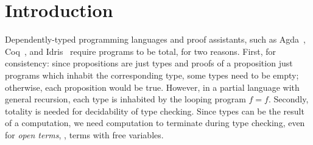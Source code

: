 \documentclass[acmlarge,review,anonymous]{acmart}\settopmatter{printfolios=true}
\begin{document}




\maketitle


\section{Introduction}
\label{sec:intro}



Dependently-typed programming languages and proof assistants, such as Agda~\citeyearpar{agdawiki}, Coq~\cite{inria:coq86}, and Idris~\cite{brady:jfp13} require programs to be total, for two reasons.  First, for consistency:  since propositions are just types and proofs of a proposition just programs which inhabit the corresponding type, some types need to be empty; otherwise, each proposition would be true.  However, in a partial language with general recursion, each type is inhabited by the looping program $f = f$.  Secondly, totality is needed for decidability of type checking.  Since types can be the result of a computation, we need computation to terminate during type checking, even for \emph{open terms}, \ie, terms with free variables.
\end{document}
